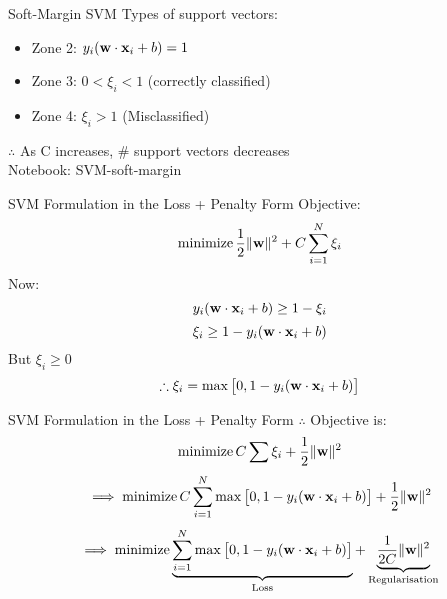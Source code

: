 \documentclass{beamer}
\begin{document}

	\begin{frame}{Soft-Margin SVM}
		Types of support vectors:
		\begin{itemize}
			\item Zone 2: $y_{i}(\mathbf{w} \cdot \mathbf{x}_{i} + b) = 1$
			\item Zone 3: $0 < \xi_{i} < 1$ (correctly classified)
			\item Zone 4: $\xi_{i} > 1$ (Misclassified)
		\end{itemize}
		$\therefore$ As C increases, \# support vectors decreases \\
		\vspace{1cm}
		Notebook: SVM-soft-margin
	\end{frame}
	\begin{frame}{SVM Formulation in the Loss + Penalty Form}
		Objective:
		$$\operatorname{minimize} \frac{1}{2}\|\mathbf{w}\|^{2} + C\sum_{i=1}^{N}\xi_{i}$$
		Now:
		$$y_{i}(\mathbf{w} \cdot \mathbf{x}_{i} + b) \geq 1 - \xi_{i}$$
		$$\xi_{i} \geq 1 - y_{i}(\mathbf{w} \cdot \mathbf{x}_{i} + b)$$
		But $\xi_{i} \geq 0$ \\
		$$\therefore \xi_{i} = \max \big[0, 1 - y_{i}(\mathbf{w} \cdot \mathbf{x}_{i} + b)\big]$$
	\end{frame}
	

	\begin{frame}{SVM Formulation in the Loss + Penalty Form}
		$\therefore$ Objective is:
		$$\operatorname{minimize} C \sum \xi_{i} + \frac{1}{2}\|\mathbf{w}\|^{2}$$
		$$\implies \operatorname{minimize} C \sum_{i=1}^{N} \max\big[0, 1 - y_{i}(\mathbf{w} \cdot \mathbf{x}_{i} + b)\big] + \frac{1}{2}\|\mathbf{w}\|^{2}$$
		$$\implies \operatorname{minimize} \underbrace{\sum_{i=1}^{N}\max \big[0, 1-y_{i}(\mathbf{w} \cdot \mathbf{x}_{i} + b)\big]}_\text{Loss} + \underbrace{ \frac{1}{2C}\|\mathbf{w}\|^{2}}_\text{Regularisation}$$
	\end{frame}
	
\end{document}
